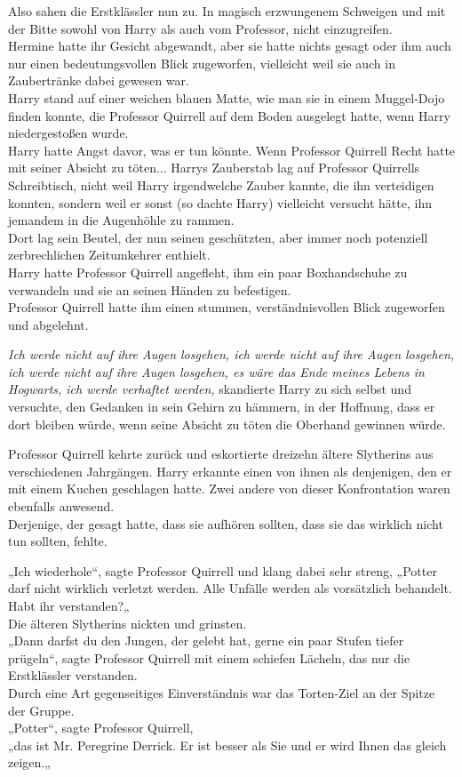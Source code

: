 {Also sahen die Erstklässler nun zu. In magisch erzwungenem Schweigen und mit der Bitte sowohl von Harry als auch vom Professor, nicht einzugreifen.\\ Hermine hatte ihr Gesicht abgewandt, aber sie hatte nichts gesagt oder ihm auch nur einen bedeutungsvollen Blick zugeworfen, vielleicht weil sie auch in Zaubertränke dabei gewesen war.\\ Harry stand auf einer weichen blauen Matte, wie man sie in einem Muggel-Dojo finden konnte, die Professor Quirrell auf dem Boden ausgelegt hatte, wenn Harry niedergestoßen wurde.\\ Harry hatte Angst davor, was er tun könnte. Wenn Professor Quirrell Recht hatte mit seiner Absicht zu töten... Harrys Zauberstab lag auf Professor Quirrells Schreibtisch, nicht weil Harry irgendwelche Zauber kannte, die ihn verteidigen konnten, sondern weil er sonst (so dachte Harry) vielleicht versucht hätte, ihn jemandem in die Augenhöhle zu rammen.\\ Dort lag sein Beutel, der nun seinen geschützten, aber immer noch potenziell zerbrechlichen Zeitumkehrer enthielt.\\ Harry hatte Professor Quirrell angefleht, ihm ein paar Boxhandschuhe zu verwandeln und sie an seinen Händen zu befestigen.\\ Professor Quirrell hatte ihm einen stummen, verständnisvollen Blick zugeworfen und abgelehnt.

\emph{Ich werde nicht auf ihre Augen losgehen, ich werde nicht auf ihre Augen losgehen, ich werde nicht auf ihre Augen losgehen, es wäre das Ende meines Lebens in Hogwarts, ich werde verhaftet werden,} skandierte Harry zu sich selbst und versuchte, den Gedanken in sein Gehirn zu hämmern, in der Hoffnung, dass er dort bleiben würde, wenn seine Absicht zu töten die Oberhand gewinnen würde.

Professor Quirrell kehrte zurück und eskortierte dreizehn ältere Slytherins aus verschiedenen Jahrgängen. Harry erkannte einen von ihnen als denjenigen, den er mit einem Kuchen geschlagen hatte. Zwei andere von dieser Konfrontation waren ebenfalls anwesend.\\ Derjenige, der gesagt hatte, dass sie aufhören sollten, dass sie das wirklich nicht tun sollten, fehlte.

„Ich wiederhole“, sagte Professor Quirrell und klang dabei sehr streng, „Potter darf nicht wirklich verletzt werden. Alle Unfälle werden als vorsätzlich behandelt. Habt ihr verstanden?„\\ Die älteren Slytherins nickten und grinsten.\\ „Dann darfst du den Jungen, der gelebt hat, gerne ein paar Stufen tiefer prügeln“, sagte Professor Quirrell mit einem schiefen Lächeln, das nur die Erstklässler verstanden.\\ Durch eine Art gegenseitiges Einverständnis war das Torten-Ziel an der Spitze der Gruppe.\\ „Potter“, sagte Professor Quirrell,\\ „das ist Mr. Peregrine Derrick. Er ist besser als Sie und er wird Ihnen das gleich zeigen.„

}
